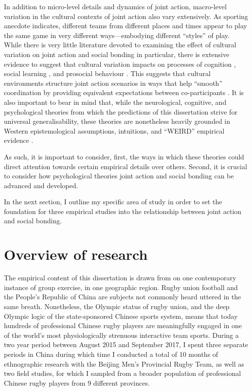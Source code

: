In addition to micro-level details and dynamics of joint action, macro-level variation in the cultural contexts of joint action also vary extensively.  As sporting anecdote indicates, different teams from different places and times appear to play the same game in very different ways---embodying different ``styles'' of play.  While there is very little literature devoted to examining the effect of cultural variation on joint action and social bonding in particular, there is extensive evidence to suggest that cultural variation impacts on processes of cognition \citep{Nisbett2003,Hoshino-Browne2005}, social learning \citep{Mesoudi2015}, and prosocial behaviour \citep{Yuki2005,Yuki2003}.  This suggests that cultural environments structure joint action scenarios in ways that help ``smooth'' coordination by providing equivalent expectations between co-participants \citep{Vesper2017}.
    It is also important to bear in mind that, while the neurological, cognitive, and psychological theories from which the predictions of this dissertation strive for universal generalisability, these theories are nonetheless heavily grounded in Western epistemological assumptions, intuitions, and ``WEIRD'' empirical evidence \citep{Henrich2010a}.

    As such, it is important to consider, first, the ways in which these theories could direct attention towards certain empirical details over others. Second, it is crucial to consider how psychological theories joint action and social bonding can be advanced and developed.

 In the next section, I outline my specific area of study in order to set the foundation for three empirical studies into the relationship between joint action and social bonding.

\section{Overview of research}
The empirical content of this dissertation is drawn from on one contemporary instance of group exercise, in one geographic region.  Rugby union football and the People's Republic of China are subjects not commonly heard uttered in the same breath.  Nonetheless, the Olympic status of rugby union, and the deep Olympic logic of the state-sponsored Chinese sports system, means that today hundreds of professional Chinese rugby players are meaningfully engaged in one of the world's most physiologically strenuous interactive team sports.  During a two year period between August 2015 and September 2017, I spent three separate periods in China during which time I conducted a total of 10 months of ethnographic research with the Beijing Men's Provincial Rugby Team, as well as two field studies, for which I sampled from a broader population of professional Chinese rugby players from 9 different provinces.


